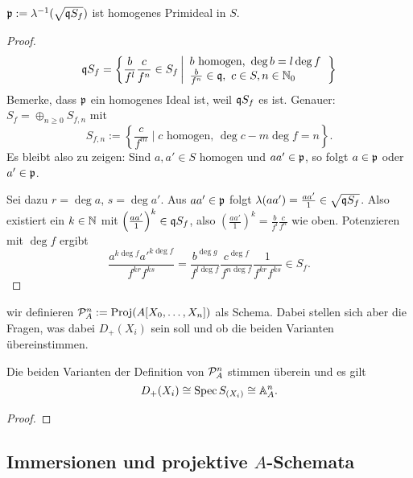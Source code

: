 \begin{hilfslemma}
	$\p := \lambda\inv(\sqrt{\q S_f})$ ist homogenes Primideal in $S$.
\end{hilfslemma}
\begin{proof}
	\[
		\q S_f = \left\{ \frac{b}{f^l} \frac{c}{f^n} \in S_f \left|
			\begin{array}{l}
				b\text{ homogen, } \deg b = l\deg f\\
				\frac{b}{f^n} \in \q,\ c\in S,n\in \N_0
			\end{array}\right. \right\}
	\]
	Bemerke, dass $\p$ ein homogenes Ideal ist, weil $\q S_f$ es ist.
	Genauer:
	$S_f = \oplus_{n\geq 0} S_{f,n}$ mit
	\[
		S_{f,n} := \left\{\frac{c}{f^m} \mid c\text{ homogen, }
			\deg c - m\deg f = n\right\}.
	\]
	Es bleibt also zu zeigen: Sind $a,a' \in S$ homogen und 
	$aa' \in \p$, so folgt $a\in \p$ oder $a'\in \p$.
	
	Sei dazu  $r = \deg a$, $s = \deg a'$.
	Aus $aa'\in \p$ folgt $\lambda(aa') = \frac{aa'}{1} \in \sqrt{\q S_f}$.
	Also existiert ein $k\in \N$ mit
	$\left(\frac{aa'}{1}\right)^k \in \q S_f$, also
	$\left( \frac{aa'}{1}\right)^k = \frac{b}{f^l} \frac{c}{f^n}$
	wie oben. Potenzieren mit $\deg f$ ergibt
	\[
		\frac{a^{k\deg f} a'^{k\deg f}}{f^{kr} f^{ks}} = 
		\frac{b^{\deg g}}{f^{l\deg f}} \frac{c^{\deg f}}{f^{n\deg f}}
		\frac{1}{f^{kr} f^{ks}} \in S_f.
	\]
	\TODO
\end{proof}

wir definieren $\P_A^n := \Proj(A[X_0,\ldots,X_n])$ als Schema. Dabei stellen
sich aber die Fragen, was dabei $D_+(X_i)$ sein soll und ob die beiden 
Varianten übereinstimmen.

\begin{lemma}
    Die beiden Varianten der Definition von $\P_A^n$ stimmen überein
    und es gilt
    \[ D_+(X_i) \cong \Spec S_{(X_i)} \cong \A_A^n.\]
\end{lemma}
\begin{proof}
    \TODO
\end{proof}

\subsection{Immersionen und projektive $A$-Schemata}

